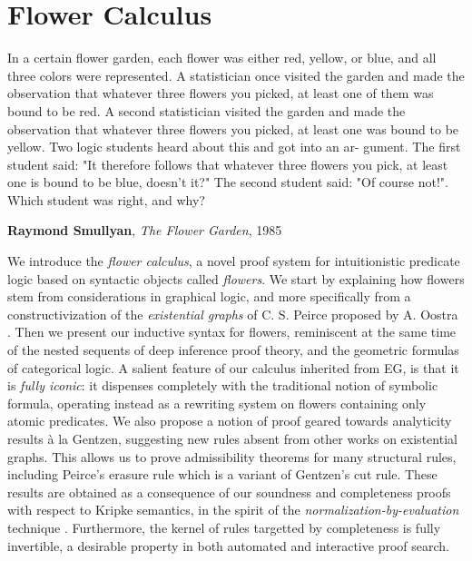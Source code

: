 \setchapterpreamble[u]{\margintoc}
\chapter{Flower Calculus}

\epigraph{In a certain flower garden, each flower was either red, yellow, or
blue, and all three colors were represented. A statistician once visited the
garden and made the observation that whatever three flowers you picked, at least
one of them was bound to be red. A second statistician visited the garden and
made the observation that whatever three flowers you picked, at least one was
bound to be yellow. Two logic students heard about this and got into an ar-
gument. The first student said: "It therefore follows that whatever three
flowers you pick, at least one is bound to be blue, doesn't it?" The second
student said: "Of course not!". Which student was right, and why?
}{\textbf{Raymond Smullyan}, \textit{The Flower Garden}, 1985}

We introduce the \emph{flower calculus}, a novel proof system for intuitionistic
predicate logic based on syntactic objects called \emph{flowers}. We start by
explaining how flowers stem from considerations in graphical logic, and more
specifically from a constructivization of the \emph{existential graphs} of C. S.
Peirce proposed by A. Oostra . Then we
present our inductive syntax for flowers, reminiscent at the same time of the
nested sequents of deep inference proof theory, and the geometric formulas of
categorical logic. A salient feature of our calculus inherited from EG, is that
it is \emph{fully iconic}: it dispenses completely with the traditional notion
of symbolic formula, operating instead as a rewriting system on flowers
containing only atomic predicates. We also propose a notion of proof geared
towards analyticity results à la Gentzen, suggesting new rules absent from other
works on existential graphs. This allows us to prove admissibility theorems for
many structural rules, including Peirce's erasure rule which is a variant of
Gentzen's cut rule. These results are obtained as a consequence of our soundness
and completeness proofs with respect to Kripke semantics, in the spirit of the
\emph{normalization-by-evaluation} technique . Furthermore, the
kernel of rules targetted by completeness is fully invertible, a desirable
property in both automated and interactive proof search.

